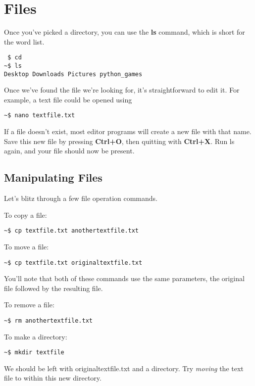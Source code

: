 \section{Files}
	
	Once you've picked a directory, you can use the \textbf{ls} command, which is short for the word list.
	
\begin{lstlisting}
 $ cd
~$ ls
Desktop Downloads Pictures python_games
\end{lstlisting}

	Once we've found the file we're looking for, it's straightforward to edit it. For example, a text file could be opened using
	
\begin{lstlisting}
~$ nano textfile.txt
\end{lstlisting}	

	If a file doesn't exist, most editor programs will create a new file with that name. Save this new file by pressing \textbf{Ctrl+O}, then quitting with \textbf{Ctrl+X}. Run ls again, and your file should now be present.

	\subsection{Manipulating Files}
	
		Let's blitz through a few file operation commands.
		
		To copy a file:
\begin{lstlisting}
~$ cp textfile.txt anothertextfile.txt
\end{lstlisting}

		To move a file:
\begin{lstlisting}
~$ cp textfile.txt originaltextfile.txt
\end{lstlisting}

		You'll note that both of these commands use the same parameters, the original file followed by the resulting file.

		To remove a file:	
\begin{lstlisting}
~$ rm anothertextfile.txt
\end{lstlisting}

		To make a directory:		
\begin{lstlisting}
~$ mkdir textfile
\end{lstlisting}

		We should be left with originaltextfile.txt and a directory. Try \textit{moving} the text file to within this new directory.
		

